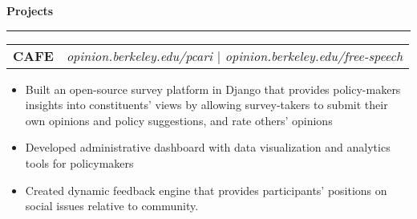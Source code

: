 \documentclass[11pt,letterpaper]{article}
\makeatletter
\newenvironment{topic}[1]
    {
    {\Large \centerline{#1}}
    \vspace*{0.03in}
    \hrule 
    \vspace*{0.05in}
    }
    {}
\newenvironment{event}
    {
    \begin{tabular*}{\textwidth}{l@{\extracolsep{\fill}}r}
    }
    {
    \end{tabular*}
    }
\makeatother
\begin{document}
    \begin{topic}{\textbf{Projects}}
        \begin{event}
            \textbf{CAFE} & \emph{opinion.berkeley.edu/pcari $\vert$ opinion.berkeley.edu/free-speech}
        \end{event}
            \begin{itemize}
                \item Built an open-source survey platform in Django that provides policy-makers insights into constituents' views by allowing survey-takers to submit their own opinions and policy suggestions, and rate others' opinions
                \item Developed administrative dashboard with data visualization and analytics tools for policymakers
                \item Created dynamic feedback engine that provides participants' positions on social issues relative to community.
            \end{itemize}




\end{topic}
\end{document}

